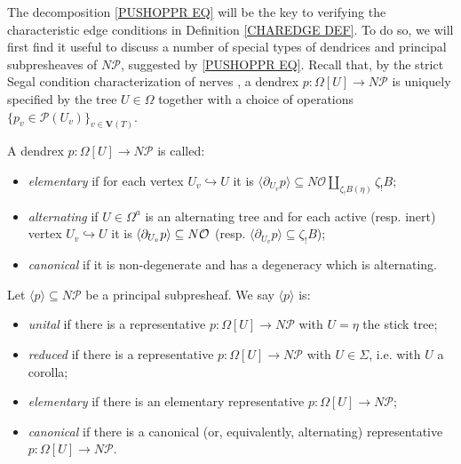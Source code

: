 \documentclass[a4paper,10pt
,draft
]{article}%
\renewcommand{\1}{\eta}%
\begin{document}
The decomposition \eqref{PUSHOPPR EQ}
will be the key to verifying the 
characteristic edge conditions in Definition \ref{CHAREDGE DEF}.
To do so, we will first find it useful to discuss a number of special types of dendrices and principal subpresheaves of $N \mathcal{P}$, suggested by \eqref{PUSHOPPR EQ}.
%
Recall that, by the strict Segal condition characterization of nerves \cite[Cor. 2.7]{CM13a},
a dendrex $p \colon \Omega[U] \to N \mathcal{P}$
is uniquely specified by the tree $U \in \Omega$ together with a choice of operations
$\{p_v \in \mathcal{P}(U_v)\}_{v \in \boldsymbol{V}(T)}$.


\begin{definition}
A dendrex $p\colon \Omega[U] \to N \mathcal{P}$ 
is called:
\begin{itemize}
\item \emph{elementary} if for each vertex $U_v \hookrightarrow U$
it is $\langle \partial_{U_v} p\rangle \subseteq N \mathcal{O} \amalg_{\zeta_!B (\eta)} \zeta_!B$; %
\item \emph{alternating} if $U \in \Omega^a$ is an alternating tree
and for each active (resp. inert) vertex 
$U_v \hookrightarrow U$ it is
$\langle \partial_{U_v} p \rangle \subseteq N \mathcal{O}$
(resp. $\langle \partial_{U_v} p \rangle \subseteq \zeta_!B$);
\item \emph{canonical} if it is non-degenerate and has a degeneracy which is alternating.
\end{itemize}
\end{definition}


\begin{definition}
Let $\langle p \rangle \subseteq N \mathcal{P}$ be 
a principal subpresheaf. 
We say $\langle p \rangle$ is:
\begin{itemize}
\item \emph{unital} if there is a representative
$p\colon \Omega[U] \to N \mathcal{P}$ with $U=\eta$ the stick tree;
\item \emph{reduced} if there is a representative
$p\colon \Omega[U] \to N \mathcal{P}$ with $U \in \Sigma$, i.e. with $U$ a corolla;
\item \emph{elementary} 
if there is an elementary representative
$p\colon \Omega[U] \to N \mathcal{P}$;
\item \emph{canonical} 
if there is a canonical (or, equivalently, alternating) representative
$p\colon \Omega[U] \to N \mathcal{P}$.
\end{itemize}
\end{definition}
\end{document}
